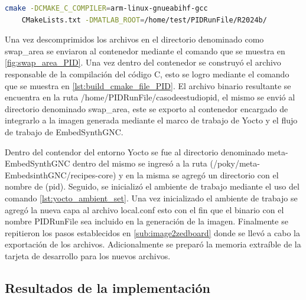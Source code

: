 \begin{lstlisting}[language=bash, caption={Compilacion del programa , Linux}, label=lst:build_cmake_file_PID]
    cmake -DCMAKE_C_COMPILER=arm-linux-gnueabihf-gcc 
    CMakeLists.txt -DMATLAB_ROOT=/home/test/PIDRunFile/R2024b/
\end{lstlisting}

Una vez descomprimidos los archivos en el directorio denominado como swap\_area se enviaron al contenedor mediante el comando que se muestra en \ref{fig:swap_area_PID}. Una vez dentro del contenedor se construyó el archivo responsable de la compilación del código C, esto se logro mediante el comando que se muestra en \ref{lst:build_cmake_file_PID}. El archivo binario resultante se encuentra en la ruta /home/PIDRunFile/casodeestudiopid, el mismo se envió al directorio denominado swap\_area, este se exporto al contenedor encargado de integrarlo a la imagen generada mediante el marco de trabajo de Yocto y el flujo de trabajo de EmbedSynthGNC. 

Dentro del contendor del entorno Yocto se fue al directorio denominado meta-EmbedSynthGNC dentro del mismo se ingresó a la ruta (/poky/meta-EmbedsinthGNC/recipes-core) y en la misma se agregó un directorio con el nombre de (pid). Seguido, se inicializó el ambiente de trabajo mediante el uso del comando \ref{lst:yocto_ambient_set}. Una vez inicializado el ambiente de trabajo se agregó la nueva capa al archivo local.conf esto con el fin que el binario con el nombre PIDRunFile sea incluido en la generación de la imagen. Finalmente se repitieron los pasos establecidos en \ref{sub:image2zedboard} donde se llevó a cabo la exportación de los archivos. Adicionalmente se preparó la memoria extraíble de la tarjeta de desarrollo para los nuevos archivos.

\subsection{Resultados de la implementación}

